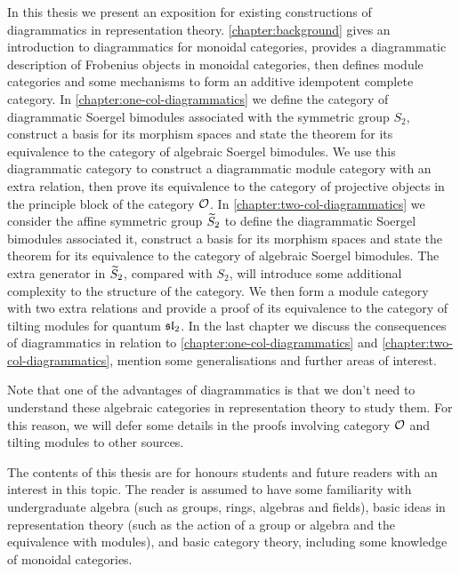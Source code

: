 In this thesis we present an exposition for existing constructions of diagrammatics in representation theory. \autoref{chapter:background} gives an introduction to diagrammatics for monoidal categories, provides a diagrammatic description of Frobenius objects in monoidal categories, then defines module categories and some mechanisms to form an additive idempotent complete category. In \autoref{chapter:one-col-diagrammatics} we define the category of diagrammatic Soergel bimodules associated with the symmetric group $S_2$, construct a basis for its morphism spaces and state the theorem for its equivalence to the category of algebraic Soergel bimodules. We use this diagrammatic category to construct a diagrammatic module category with an extra relation, then prove its equivalence to the category of projective objects in the principle block of the category $\mathcal{O}$. In \autoref{chapter:two-col-diagrammatics} we consider the affine symmetric group $\widetilde{S}_2$ to define the diagrammatic Soergel bimodules associated it, construct a basis for its morphism spaces and state the theorem for its equivalence to the category of algebraic Soergel bimodules. The extra generator in $\widetilde{S}_2$, compared with $S_2$, will introduce some additional complexity to the structure of the category. We then form a module category with two extra relations and provide a proof of its equivalence to the category of tilting modules for quantum $\operatorname{\mathfrak{sl}}_2$. In the last chapter we discuss the consequences of diagrammatics in relation to \autoref{chapter:one-col-diagrammatics} and \autoref{chapter:two-col-diagrammatics}, mention some generalisations and further areas of interest.

Note that one of the advantages of diagrammatics is that we don't need to understand these algebraic categories in representation theory to study them. For this reason, we will defer some details in the proofs involving category $\mathcal{O}$ and tilting modules to other sources.

The contents of this thesis are for honours students and future readers with an interest in this topic. The reader is assumed to have some familiarity with undergraduate algebra (such as groups, rings, algebras and fields), basic ideas in representation theory (such as the action of a group or algebra and the equivalence with modules), and basic category theory, including some knowledge of monoidal categories.
